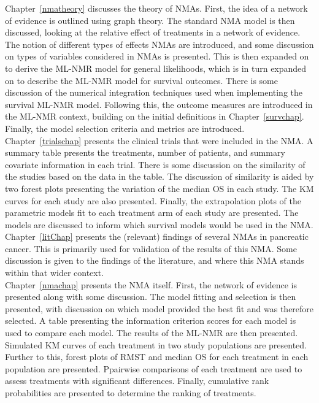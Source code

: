 Chapter~\ref{nmatheory} discusses the theory of NMAs. First, the idea of a network of evidence is outlined using graph theory. The standard NMA model is then discussed, looking at the relative effect of treatments in a network of evidence. The notion of different types of effects NMAs are introduced, and some discussion on types of variables considered in NMAs is presented. This is then expanded on to derive the ML-NMR model for general likelihoods, which is in turn expanded on to describe the ML-NMR model for survival outcomes. There is some discussion of the numerical integration techniques used when implementing the survival ML-NMR model. Following this, the outcome measures are introduced in the ML-NMR context, building on the initial definitions in Chapter~\ref{survchap}. Finally, the model selection criteria and metrics are introduced. \\

Chapter~\ref{trialschap} presents the clinical trials that were included in the NMA. A summary table presents the treatments, number of patients, and summary covariate information in each trial. There is some discussion on the similarity of the studies based on the data in the table. The discussion of similarity is aided by two forest plots presenting the variation of the median OS in each study. The KM curves for each study are also presented. Finally, the extrapolation plots of the parametric models fit to each treatment arm of each study are presented. The models are discussed to inform which survival models would be used in the NMA. \\

Chapter~\ref{litChap} presents the (relevant) findings of several NMAs in pancreatic cancer. This is primarily used for validation of the results of this NMA. Some discussion is given to the findings of the literature, and where this NMA stands within that wider context. \\

Chapter~\ref{nmachap} presents the NMA itself. First, the network of evidence is presented along with some discussion. The model fitting and selection is then presented, with discussion on which model provided the best fit and was therefore selected. A table presenting the information criterion scores for each model is used to compare each model. The results of the ML-NMR are then presented. Simulated KM curves of each treatment in two study populations are presented. Further to this, forest plots of RMST and median OS for each treatment in each population are presented. Ppairwise comparisons of each treatment are used to assess treatments with significant differences. Finally, cumulative rank probabilities are presented to determine the ranking of treatments.  \\

